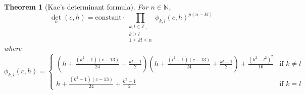 \documentclass[a4paper, 12pt, reqno]{amsart}
\newtheorem{theorem}{Theorem}[subsection]
\theoremstyle{remark}
\numberwithin{equation}{subsection}
\begin{document}
\begin{theorem}[Kac's determinant formula{}]
  \label{thr:44}
  For $n \in \mathbb{N}$,
  \begin{equation*}
    \textstyle\det_n(c, h) = \displaystyle\text{constant}\cdot \prod_{\substack{k, l \in \mathbb{Z}_+\\k \ge l\\ 1 \le kl \le n}} \phi_{k, l}(c, h)^{p(n - kl)}
  \end{equation*}
  where
  \begin{equation*}
    \phi_{k, l}(c, h)=
    \begin{cases}
      (h + \frac{(k^2 - 1)(c - 13)}{24} + \frac{kl - 1}{2})(h + \frac{(l^2 - 1)(c - 13)}{24} + \frac{kl - 1}{2}) + \frac{(k^2 - l^2)^2}{16} & \text{if }k \neq l\\
      h + \frac{(k^2 - 1)(c - 13)}{24} + \frac{k^2 - 1}{2} & \text{if }k = l
    \end{cases}
  \end{equation*}
\end{theorem}

\printindex



\end{document}
